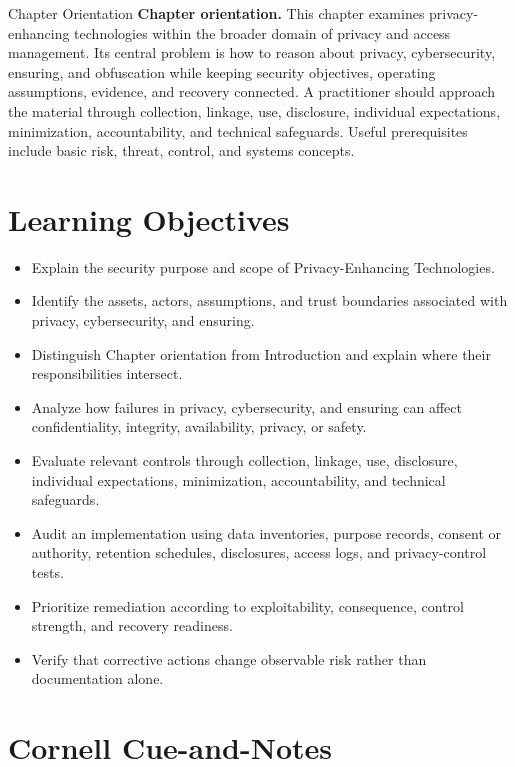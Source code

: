 \documentclass[11pt,letterpaper]{article}
\title{\CornellDocumentTitle}
\author{}
\date{}
\begin{document}
\maketitle
\begin{CornellOverviewBox}{Chapter Orientation}
\textbf{Chapter orientation.} This chapter examines privacy-enhancing technologies within the broader domain of privacy and access management. Its central problem is how to reason about privacy, cybersecurity, ensuring, and obfuscation while keeping security objectives, operating assumptions, evidence, and recovery connected. A practitioner should approach the material through collection, linkage, use, disclosure, individual expectations, minimization, accountability, and technical safeguards. Useful prerequisites include basic risk, threat, control, and systems concepts.
\end{CornellOverviewBox}
\section*{Learning Objectives}
\begin{itemize}
\item Explain the security purpose and scope of Privacy-Enhancing Technologies.
\item Identify the assets, actors, assumptions, and trust boundaries associated with privacy, cybersecurity, and ensuring.
\item Distinguish Chapter orientation from Introduction and explain where their responsibilities intersect.
\item Analyze how failures in privacy, cybersecurity, and ensuring can affect confidentiality, integrity, availability, privacy, or safety.
\item Evaluate relevant controls through collection, linkage, use, disclosure, individual expectations, minimization, accountability, and technical safeguards.
\item Audit an implementation using data inventories, purpose records, consent or authority, retention schedules, disclosures, access logs, and privacy-control tests.
\item Prioritize remediation according to exploitability, consequence, control strength, and recovery readiness.
\item Verify that corrective actions change observable risk rather than documentation alone.
\end{itemize}
\section*{Cornell Cue-and-Notes}
\end{document}
